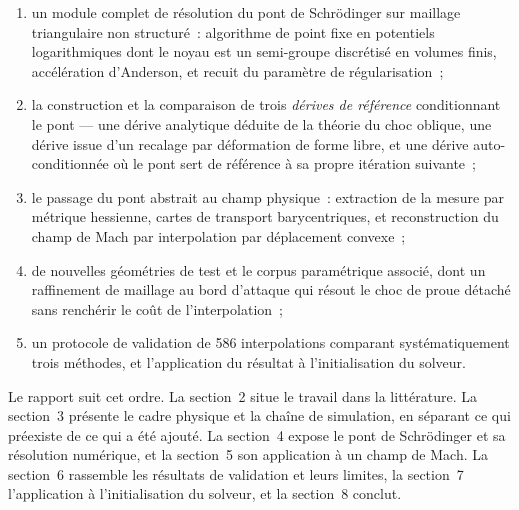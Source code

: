 \documentclass[11pt,a4paper]{article}
\begin{document}
\begin{enumerate}[leftmargin=1.6em,itemsep=0.2em]
  \item un module complet de résolution du pont de Schrödinger sur maillage
        triangulaire non structuré~: algorithme de point fixe en potentiels
        logarithmiques dont le noyau est un semi-groupe discrétisé en volumes finis,
        accélération d'Anderson, et recuit du paramètre de régularisation~;
  \item la construction et la comparaison de trois \emph{dérives de référence}
        conditionnant le pont --- une dérive analytique déduite de la théorie du choc
        oblique, une dérive issue d'un recalage par déformation de forme libre, et une
        dérive auto-conditionnée où le pont sert de référence à sa propre itération
        suivante~;
  \item le passage du pont abstrait au champ physique~: extraction de la mesure par
        métrique hessienne, cartes de transport barycentriques, et reconstruction du
        champ de Mach par interpolation par déplacement convexe~;
  \item de nouvelles géométries de test et le corpus paramétrique associé, dont un
        raffinement de maillage au bord d'attaque qui résout le choc de proue détaché
        sans renchérir le coût de l'interpolation~;
  \item un protocole de validation de 586 interpolations comparant systématiquement
        trois méthodes, et l'application du résultat à l'initialisation du solveur.
\end{enumerate}

Le rapport suit cet ordre. La section~2 situe le travail dans la littérature. La
section~3 présente le cadre physique et la chaîne de simulation, en séparant ce qui
préexiste de ce qui a été ajouté. La section~4 expose le pont de Schrödinger et sa
résolution numérique, et la section~5 son application à un champ de Mach. La section~6
rassemble les résultats de validation et leurs limites, la section~7 l'application à
l'initialisation du solveur, et la section~8 conclut.


\clearpage
\nocite{*}


\end{document}
